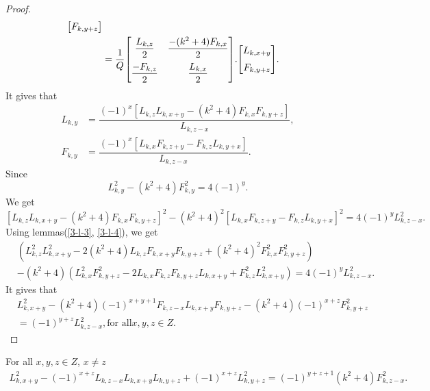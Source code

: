 \begin{proof}
\begin{align*}
{\begin{bmatrix}{}
    F_{k,y+z} \\
	\end{bmatrix}
	}\\
	&=\dfrac{1}{Q}{
 \begin{bmatrix}{}
    \dfrac{L_{k,z}}{2} & \dfrac{-(k^2+4)F_{k,x}}{2}\vspace{.2cm} \\
    \dfrac{-F_{k,z}}{2} & \dfrac{L_{k,x}}{2} \\
	\end{bmatrix}
	}.{
 \begin{bmatrix}{}
    L_{k,x+y}\vspace{.2cm} \\
    F_{k,y+z} \\
	\end{bmatrix}
	}.	
	\end{align*}
	It gives that
	\begin{align*}
	L_{k,y}&=\dfrac{(-1)^x[L_{k,z}L_{k,x+y}-(k^2+4)F_{k,x}F_{k,y+z}]}{L_{k,z-x}},\\
	F_{k,y}&=\dfrac{(-1)^x[L_{k,x}F_{k,z+y}-F_{k,z}L_{k,y+x}]}{L_{k,z-x}}.
	\end{align*}	
Since
$$L^2_{k,y}-(k^2+4)F^2_{k,y}=4(-1)^y.$$
We get
$$[L_{k,z}L_{k,x+y}-(k^2+4)F_{k,x}F_{k,y+z}]^2-(k^2+4)^2[L_{k,x}F_{k,z+y}-F_{k,z}L_{k,y+x}]^2=4(-1)^yL^2_{k,z-x}.$$
Using lemmas(\ref{3-l-3}, \ref{3-l-4}), we get 
\begin{align*}
&(L^2_{k,z}L^2_{k,x+y}-2(k^2+4)L_{k,z}F_{k,x+y}F_{k,y+z}+(k^2+4)^2F^2_{k,x}F^2_{k,y+z})\\&-(k^2+4)(L^2_{k,x}F^2_{k,y+z}-2L_{k,x}F_{k,z}F_{k,y+z}L_{k,x+y}+F^2_{k,z}L^2_{k,x+y})=4(-1)^yL^2_{k,z-x}.
\end{align*}
It gives that
\begin{align*}
&L^2_{k,x+y}-(k^2+4)(-1)^{x+y+1}F_{k,z-x}L_{k,x+y}F_{k,y+z}-(k^2+4)(-1)^{x+z}F^2_{k,y+z}\\&=(-1)^{y+z}L^2_{k,z-x}, \text{for all} x,y,z\in Z.
\end{align*}
\end{proof}
\begin{theorem}For all $x,y,z\in Z $, $x\neq z$
\begin{align*}
L^2_{k,x+y}-(-1)^{x+z}L_{k,z-x}L_{k,x+y}L_{k,y+z}+(-1)^{x+z}L^2_{k,y+z}=(-1)^{y+z+1}(k^2+4)F^2_{k,z-x}.
\end{align*}
\end{theorem}
